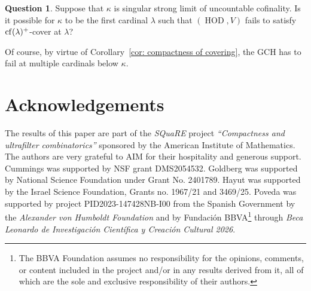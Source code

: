 \documentclass[11pt]{amsart}
\theoremstyle{definition}
\newtheorem{question}[theorem]{Question}
\theoremstyle{remark}
\DeclareMathOperator{\HOD}{HOD}
\newcommand{\cf}{{\rm cf}}
\begin{document}
\begin{question}
 Suppose that $\kappa$ is singular strong limit  of uncountable cofinality. Is it possible for $\kappa$ to be the first cardinal $\lambda$ such that $(\HOD, V)$ fails to satisfy $\cf(\lambda)^+$-cover at $\lambda$?
\end{question}
Of course, by virtue of Corollary~\ref{cor: compactness of covering}, the GCH has to fail at multiple cardinals below $\kappa$.
\section*{Acknowledgements}
The results of this paper are part of the \emph{SQuaRE}  project \emph{``Compactness and ultrafilter combinatorics''} sponsored by the  American Institute of Mathematics. The authors are very grateful to AIM for their hospitality and generous support. Cummings was supported by NSF grant DMS2054532. Goldberg was supported by National Science Foundation under Grant No. 2401789.
Hayut was supported by the Israel Science Foundation, Grants no. 1967/21 and 3469/25. Poveda was supported by project  PID2023-147428NB-I00 from the Spanish Government by the \emph{Alexander von Humboldt Foundation} and by Fundación BBVA\footnote{The BBVA Foundation assumes no responsibility for the opinions, comments, or content included in the project and/or in any results derived from it, all of which are the sole and exclusive responsibility of their authors.} through \emph{Beca Leonardo de Investigación Científica y Creación Cultural 2026}.

    

\end{document}
